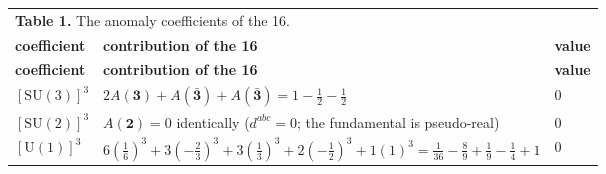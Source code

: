 \documentclass[aps,prd,amsmath,amssymb,superscriptaddress,longbibliography,floatfix,preprint]{revtex4-2}
\begin{document}
{\footnotesize
\renewcommand{\arraystretch}{1.45}

\begin{longtable}{lll}
\multicolumn{3}{l}{\textbf{Table 1.} The anomaly coefficients of the 16.} \\
\addlinespace[2pt]
\toprule
\parbox[c]{4.25cm}{\vspace{2.5pt}\raggedright {} \textbf{coefficient}\vspace{2.5pt}} & \parbox[c]{9.39cm}{\vspace{2.5pt}\raggedright {} \textbf{contribution of the 16}\vspace{2.5pt}} & \textbf{value} \\
\midrule
\endfirsthead
\toprule
\parbox[c]{4.25cm}{\vspace{2.5pt}\raggedright {} \textbf{coefficient}\vspace{2.5pt}} & \parbox[c]{9.39cm}{\vspace{2.5pt}\raggedright {} \textbf{contribution of the 16}\vspace{2.5pt}} & \textbf{value} \\
\midrule
\endhead
\midrule
\endfoot
\bottomrule
\endlastfoot
\parbox[c]{4.25cm}{\vspace{2.5pt}\raggedright {} \mbox{$[\mathrm{SU}(3)]^3$}\vspace{2.5pt}} & \parbox[c]{9.39cm}{\vspace{2.5pt}\raggedright {} $2A(\mathbf 3) + A(\bar{\mathbf 3}) + A(\bar{\mathbf 3}) = 1 - \tfrac12 - \tfrac12$\vspace{2.5pt}} & $0$ \\
\hline{}
\parbox[c]{4.25cm}{\vspace{2.5pt}\raggedright {} \mbox{$[\mathrm{SU}(2)]^3$}\vspace{2.5pt}} & \parbox[c]{9.39cm}{\vspace{2.5pt}\raggedright {} \mbox{$A(\mathbf 2) = 0$} identically (\mbox{$d^{abc}=0$}; the fundamental is pseudo-real)\vspace{2.5pt}} & $0$ \\
\hline{}
\parbox[c]{4.25cm}{\vspace{2.5pt}\raggedright {} \mbox{$[\mathrm{U}(1)]^3$}\vspace{2.5pt}} & \parbox[c]{9.39cm}{\vspace{2.5pt}\raggedright {} $6(\tfrac16)^3 + 3(-\tfrac23)^3 + 3(\tfrac13)^3 + 2(-\tfrac12)^3 + 1(1)^3 = \tfrac1{36}-\tfrac89+\tfrac19-\tfrac14+1$\vspace{2.5pt}} & $0$ \\

\end{longtable}}
\end{document}
